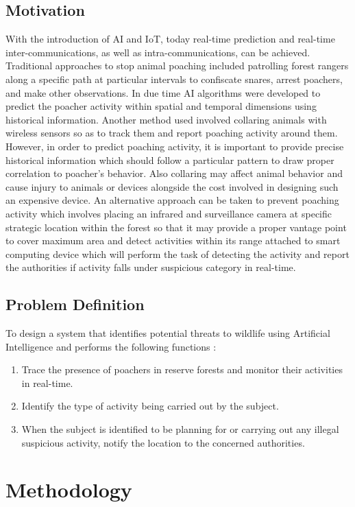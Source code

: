 \documentclass[12pt]{extarticle}
\begin{document}
\subsection{Motivation}
With the introduction of AI and IoT, today real-time prediction and real-time 
inter-communications, as well as intra-communications, can be achieved. Traditional approaches 
to stop animal poaching included patrolling forest rangers along a specific path at particular 
intervals to confiscate snares, arrest poachers, and make other observations. In due time AI 
algorithms were developed to predict the poacher activity within spatial and temporal dimensions 
using historical information. Another method used involved collaring animals with wireless 
sensors so as to track them and report poaching activity around them. However, in order to 
predict poaching activity, it is important to provide precise historical information which should 
follow a particular pattern to draw proper correlation to poacher’s behavior. Also collaring may 
affect animal behavior and cause injury to animals or devices alongside the cost involved in 
designing such an expensive device. An alternative approach can be taken to prevent poaching 
activity which involves placing an infrared and surveillance camera at specific strategic location 
within the forest so that it may provide a proper vantage point to cover maximum area and detect 
activities within its range attached to smart computing device which will perform the task of 
detecting the activity and report the authorities if activity falls under suspicious category in 
real-time. 

\subsection{Problem Definition}
To design a system that identifies potential threats to wildlife using Artificial Intelligence and 
performs the following functions :
\begin{enumerate}
	\item Trace the presence of poachers in reserve forests and monitor their activities in real-time.
	\item Identify the type of activity being carried out by the subject. 
	\item When the subject is identified to be planning for or carrying out any illegal suspicious 
	activity, notify the location to the concerned authorities. 
\end{enumerate} 

\section{Methodology}
\end{document}
